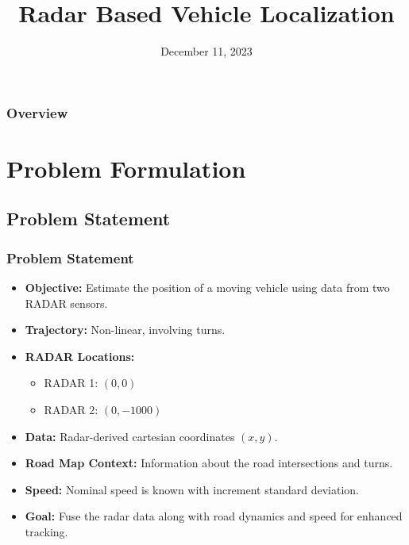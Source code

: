 \documentclass{beamer}
\title[Localization using RADAR]{Radar Based Vehicle Localization} %
\author[Awies \& Prathamesh]
{%
   \texorpdfstring{
        \begin{columns}
            \column{.45\linewidth}
            \centering
            Prathamesh Saraf\\
            A59015739\\
            \href{mailto:psaraf@ucsd.edu}{psaraf@ucsd.edu} 
            \column{.45\linewidth}
            \centering
            Awies Mohammad Mulla\\
            A59016119 \\
            \href{mailto:amulla@ucsd.edu}{amulla@ucsd.edu}
        \end{columns}
   }
   {Awies Mohammad Mulla \& Prathamesh Saraf}
}%
\institute[UCSD] %
{
\Large
\textbf{University of California, San Diego} \\ %
\medskip
}
\date{December 11, 2023} %
\begin{document}
\begin{frame}
\titlepage %
\end{frame}

\begin{frame}
\frametitle{Overview} %
\tableofcontents %
\end{frame}

\section{Problem Formulation} %
\subsection{Problem Statement}
\begin{frame}
\frametitle{Problem Statement}
\begin{itemize}
    \item \textbf{Objective:} Estimate the position of a moving vehicle using data from two RADAR sensors.
    \item \textbf{Trajectory:} Non-linear, involving turns.
    \item \textbf{RADAR Locations:} 
        \begin{itemize}
            \item RADAR 1: $(0, 0)$
            \item RADAR 2: $(0, -1000)$
        \end{itemize}
    \item \textbf{Data:} Radar-derived cartesian coordinates $(x, y)$.
    \item \textbf{Road Map Context:} Information about the road intersections and turns.
    \item \textbf{Speed:} Nominal speed is known with increment standard deviation.
    \item \textbf{Goal:} Fuse the radar data along with road dynamics and speed for enhanced tracking.
\end{itemize}
\end{frame}
\end{document}
